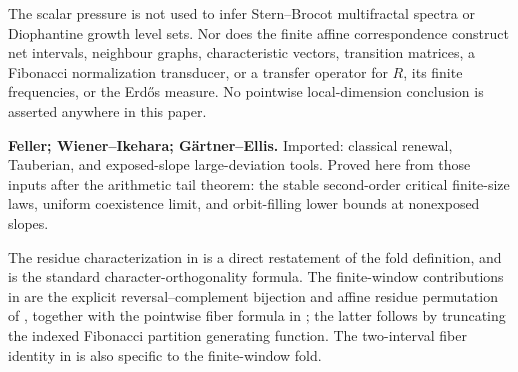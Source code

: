 The scalar pressure is not used to infer Stern--Brocot multifractal spectra
or Diophantine growth level sets.  Nor does the finite affine correspondence
construct net intervals, neighbour graphs, characteristic vectors,
transition matrices, a Fibonacci normalization transducer, or a transfer
operator for \(R\), its finite frequencies, or the Erd\H{o}s measure.  No
pointwise local-dimension conclusion is asserted anywhere in this paper.

\noindent\textbf{Feller; Wiener--Ikehara; G\"artner--Ellis.}
Imported: classical renewal, Tauberian, and exposed-slope large-deviation
tools.  Proved here from those inputs after the arithmetic tail theorem: the
stable second-order critical finite-size laws, uniform coexistence limit, and
orbit-filling lower bounds at nonexposed slopes.

The residue characterization in  is a direct
restatement of the fold definition, and  is the
standard character-orthogonality formula.  The finite-window contributions in
 are the explicit reversal--complement bijection and
affine residue permutation of , together with the
pointwise fiber formula in ; the latter follows
by truncating the indexed Fibonacci partition generating function.  The
two-interval fiber identity in  is also
specific to the finite-window fold.

